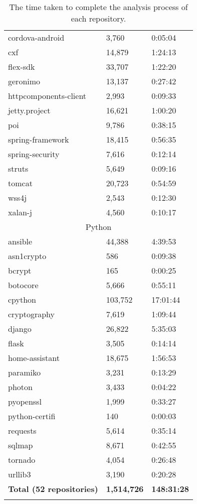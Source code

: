 \documentclass[acb16zje.tex]{subfiles}
\begin{document}
\begin{longtable}{|l|l|l|}
  cordova-android & 3,760 & 0:05:04 \\
  cxf & 14,879 & 1:24:13 \\
  flex-sdk & 33,707 & 1:22:20 \\
  geronimo & 13,137 & 0:27:42 \\
  httpcomponents-client & 2,993 & 0:09:33 \\
  jetty.project & 16,621 & 1:00:20 \\
  poi & 9,786 & 0:38:15 \\
  spring-framework & 18,415 & 0:56:35 \\
  spring-security & 7,616 & 0:12:14 \\
  struts & 5,649 & 0:09:16 \\
  tomcat & 20,723 & 0:54:59 \\
  wss4j & 2,543 & 0:12:30 \\
  xalan-j & 4,560 & 0:10:17 \\ \hline
  \multicolumn{3}{|c|}{\cellcolor[HTML]{D8D8D8}Python} \\ \hline
  ansible & 44,388 & 4:39:53 \\
  asn1crypto & 586 & 0:09:38 \\
  bcrypt & 165 & 0:00:25 \\
  botocore & 5,666 & 0:55:11 \\
  cpython & 103,752 & 17:01:44 \\
  cryptography & 7,619 & 1:09:44 \\
  django & 26,822 & 5:35:03 \\
  flask & 3,505 & 0:14:14 \\
  home-assistant & 18,675 & 1:56:53 \\
  paramiko & 3,231 & 0:13:29 \\
  photon & 3,433 & 0:04:22 \\
  pyopenssl & 1,999 & 0:33:27 \\
  python-certifi & 140 & 0:00:03 \\
  requests & 5,614 & 0:35:14 \\
  sqlmap & 8,671 & 0:42:55 \\
  tornado & 4,054 & 0:26:48 \\
  urllib3 & 3,190 & 0:20:28 \\ \hline
  \textbf{Total (52 repositories)} & \textbf{1,514,726} & \textbf{148:31:28} \\ \hline
  \caption{The time taken to complete the analysis process of each repository.}
  \label{table:perf_result}
\end{longtable}
\end{document}
